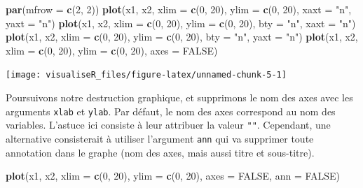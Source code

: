 \documentclass[]{article}
\newenvironment{Shaded}{\begin{snugshade}}{\end{snugshade}}
\newcommand{\DataTypeTok}[1]{\textcolor[rgb]{0.13,0.29,0.53}{#1}}
\newcommand{\DecValTok}[1]{\textcolor[rgb]{0.00,0.00,0.81}{#1}}
\newcommand{\KeywordTok}[1]{\textcolor[rgb]{0.13,0.29,0.53}{\textbf{#1}}}
\newcommand{\NormalTok}[1]{#1}
\newcommand{\OtherTok}[1]{\textcolor[rgb]{0.56,0.35,0.01}{#1}}
\newcommand{\StringTok}[1]{\textcolor[rgb]{0.31,0.60,0.02}{#1}}
\begin{document}
\begin{Shaded}
\begin{Highlighting}[]
\KeywordTok{par}\NormalTok{(}\DataTypeTok{mfrow =} \KeywordTok{c}\NormalTok{(}\DecValTok{2}\NormalTok{, }\DecValTok{2}\NormalTok{))}
\KeywordTok{plot}\NormalTok{(x1, x2, }\DataTypeTok{xlim =} \KeywordTok{c}\NormalTok{(}\DecValTok{0}\NormalTok{, }\DecValTok{20}\NormalTok{), }\DataTypeTok{ylim =} \KeywordTok{c}\NormalTok{(}\DecValTok{0}\NormalTok{, }\DecValTok{20}\NormalTok{), }\DataTypeTok{xaxt =} \StringTok{"n"}\NormalTok{, }\DataTypeTok{yaxt =} \StringTok{"n"}\NormalTok{)}
\KeywordTok{plot}\NormalTok{(x1, x2, }\DataTypeTok{xlim =} \KeywordTok{c}\NormalTok{(}\DecValTok{0}\NormalTok{, }\DecValTok{20}\NormalTok{), }\DataTypeTok{ylim =} \KeywordTok{c}\NormalTok{(}\DecValTok{0}\NormalTok{, }\DecValTok{20}\NormalTok{), }\DataTypeTok{bty =} \StringTok{"n"}\NormalTok{, }\DataTypeTok{xaxt =} \StringTok{"n"}\NormalTok{)}
\KeywordTok{plot}\NormalTok{(x1, x2, }\DataTypeTok{xlim =} \KeywordTok{c}\NormalTok{(}\DecValTok{0}\NormalTok{, }\DecValTok{20}\NormalTok{), }\DataTypeTok{ylim =} \KeywordTok{c}\NormalTok{(}\DecValTok{0}\NormalTok{, }\DecValTok{20}\NormalTok{), }\DataTypeTok{bty =} \StringTok{"n"}\NormalTok{, }\DataTypeTok{yaxt =} \StringTok{"n"}\NormalTok{)}
\KeywordTok{plot}\NormalTok{(x1, x2, }\DataTypeTok{xlim =} \KeywordTok{c}\NormalTok{(}\DecValTok{0}\NormalTok{, }\DecValTok{20}\NormalTok{), }\DataTypeTok{ylim =} \KeywordTok{c}\NormalTok{(}\DecValTok{0}\NormalTok{, }\DecValTok{20}\NormalTok{), }\DataTypeTok{axes =} \OtherTok{FALSE}\NormalTok{)}
\end{Highlighting}
\end{Shaded}

\begin{center}\texttt{[image: visualiseR\_files/figure-latex/unnamed-chunk-5-1]} \end{center}

Poursuivons notre destruction graphique, et supprimons le nom des axes avec les arguments \texttt{xlab} et \texttt{ylab}. Par défaut, le nom des axes correspond au nom des variables. L'astuce ici consiste à leur attribuer la valeur \texttt{""}. Cependant, une alternative consisterait à utiliser l'argument \texttt{ann} qui va supprimer toute annotation dans le graphe (nom des axes, mais aussi titre et sous-titre).

\begin{Shaded}
\begin{Highlighting}[]
\KeywordTok{plot}\NormalTok{(x1, x2, }\DataTypeTok{xlim =} \KeywordTok{c}\NormalTok{(}\DecValTok{0}\NormalTok{, }\DecValTok{20}\NormalTok{), }\DataTypeTok{ylim =} \KeywordTok{c}\NormalTok{(}\DecValTok{0}\NormalTok{, }\DecValTok{20}\NormalTok{), }\DataTypeTok{axes =} \OtherTok{FALSE}\NormalTok{, }\DataTypeTok{ann =} \OtherTok{FALSE}\NormalTok{)}
\end{Highlighting}
\end{Shaded}
\end{document}
